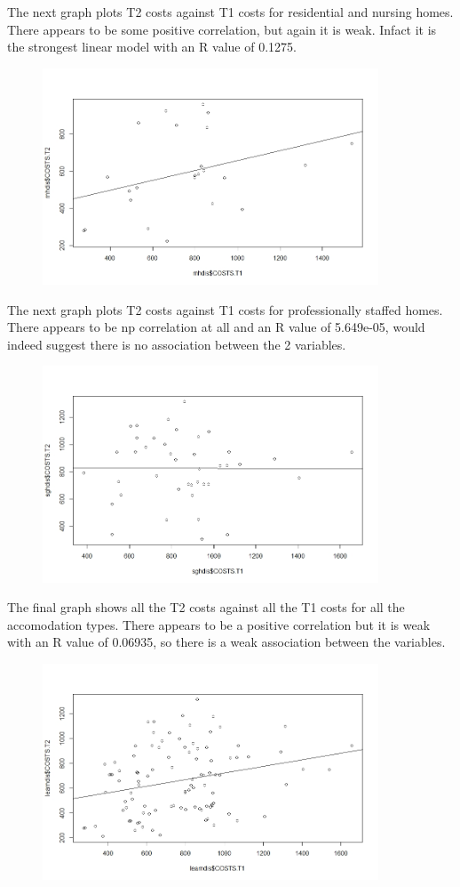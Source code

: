 \documentclass[]{article}
\begin{document}
\newpage
The next graph plots T2 costs against T1 costs for residential and nursing homes. There appears to be some positive correlation, but again it is weak. Infact it is the strongest linear model with an R value of 0.1275.
\begin{figure}[H]
\centering
\includegraphics[width=10cm]{RStudio/jpeg/Reg_RNH.jpeg}
\end{figure}
The next graph plots T2 costs against T1 costs for professionally staffed homes. There appears to be np correlation at all and an R value of 5.649e-05, would indeed suggest there is no association between the 2 variables.
\begin{figure}[H]
\centering
\includegraphics[width=10cm]{RStudio/jpeg/Reg_SGH.jpeg}
\end{figure}
\newpage
The final graph shows all the T2 costs against all the T1 costs for all the accomodation types. There appears to be a positive correlation but it is weak with an R value of 0.06935, so there is a weak association between the variables.
\begin{figure}[H]
\centering
\includegraphics[width=10cm]{RStudio/jpeg/Reg_COST.jpeg}
\end{figure}
\end{document}
